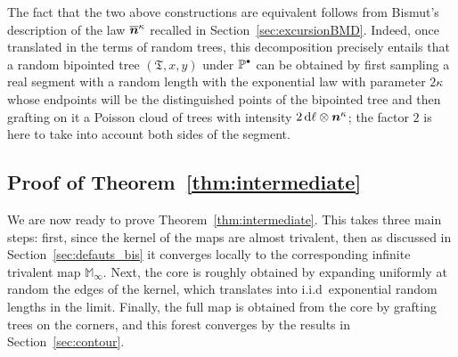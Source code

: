 \documentclass[JEP,XML,SOM,Unicode,NoFloatCountersInSection,NoEqCountersInSection]{cedram}
\newcommand{\sbullet}{{\raisebox{1pt}{$\scriptscriptstyle\bullet $}}}
\newcommand{\bmn}{\protect\boldsymbol{n}}
\theoremstyle{plain}
\theoremstyle{definition}
\theoremstyle{remark}
\renewcommand{\P}{\mathbb{P}}
\renewcommand{\d}{\mathop{}\!\mathrm{d}}
\newcommand{\Tree}{\mathfrak{T}}
\newcommand{\Mapb}{\mathbb{M}}
\begin{document}
The fact that the two above constructions are equivalent follows from Bismut's description of the law $ \overline{\bmn}^{\kappa}$ recalled in Section~\ref{sec:excursionBMD}. Indeed, once translated in the terms of random trees, this decomposition precisely entails that a random bipointed tree $(\Tree,x,y)$ under $\P^{\sbullet}$ can be obtained by first sampling a real segment with a random length with the exponential law with parameter $2 \kappa$ whose endpoints will be the distinguished points of the bipointed tree and then grafting on it a Poisson cloud of trees with intensity $ 2\d \ell \otimes \bmn^{\kappa}$; the factor $2$ is here to take into account both sides of the segment.

\subsection{Proof of Theorem~\ref{thm:intermediate}}

We are now ready to prove Theorem~\ref{thm:intermediate}. This takes three main steps: first, since the kernel of the maps are almost trivalent, then as discussed in Section~\ref{sec:defauts_bis} it converges locally to the corresponding infinite trivalent map $\Mapb_\infty$. Next, the core is roughly obtained by expanding uniformly at random the edges of the kernel, which translates into i.i.d~exponential random lengths in the limit. Finally, the full map is obtained from the core by grafting trees on the corners, and this forest converges by the results in Section~\ref{sec:contour}.
\end{document}
